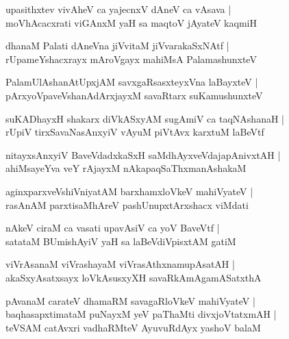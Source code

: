 \documentclass[twoside,12pt,openright]{book}
\newcounter{shloka}[chapter]
\begin{document}
\begin{shloka}%
upasithxtev vivAheV ca yajecnxV dAneV ca vAsava |\\
moVhAcacxrati viGAnxM yaH sa maqtoV jAyateV kaqmiH
\end{shloka}

\begin{shloka}%
dhanaM Palati dAneVna jiVvitaM jiVvarakaSxNAtf |\\
rUpameYshacxrayx mAroVgayx mahiMsA PalamashunxteV 
\end{shloka}

\begin{shloka}%
PalamUlAshanAtUpxjAM savxgaRsasxteyxVna laBayxteV |\\
pArxyoVpaveVshanAdArxjayxM savaRtarx suKamushunxteV
\end{shloka}

\begin{shloka}%
suKADhayxH shakarx diVkASxyAM sugAmiV ca taqNAshanaH |\\
rUpiV tirxSavaNasAnxyiV vAyuM piVtAvx karxtuM laBeVtf 
\end{shloka}

\begin{shloka}%
nitayxsAnxyiV BaveVdadxkaSxH saMdhAyxveVdajapAnivxtAH |\\
ahiMsayeYva veY rAjayxM nAkapaqSaThxmanAshakaM
\end{shloka}

\begin{shloka}%
aginxparxveVshiVniyatAM barxhamxloVkeV mahiVyateV |\\
rasAnAM parxtisaMhAreV pashUnupxtArxshacx viMdati
\end{shloka}

\begin{shloka}%
nAkeV ciraM ca vasati upavAsiV ca yoV BaveVtf |\\
satataM BUmishAyiV yaH sa laBeVdiVpisxtAM gatiM 
\end{shloka}

\begin{shloka}%
viVrAsanaM viVrashayaM viVrasAthxnamupAsatAH |\\
akaSxyAsatxsayx loVkAsusxyXH savaRkAmAgamASatxthA 
\end{shloka}

\begin{shloka}%
pAvanaM carateV dhamaRM savagaRloVkeV mahiVyateV |\\
baqhasapxtimataM puNayxM yeV paThaMti divxjoVtatxmAH |\\
teVSAM catAvxri vadhaRMteV AyuvuRdAyx yashoV balaM
\end{shloka}
\end{document}
